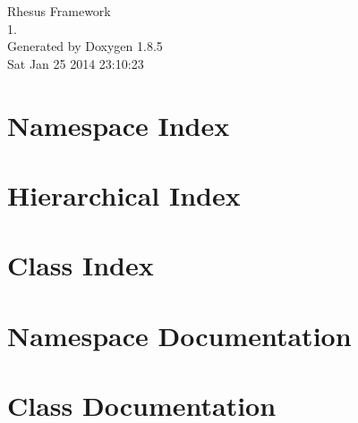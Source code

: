 \documentclass[twoside]{book}
\newcommand{\clearemptydoublepage}{%
  \newpage{\pagestyle{empty}\cleardoublepage}%
}
\begin{document}
\hypersetup{pageanchor=false}
\begin{titlepage}
\vspace*{7cm}
\begin{center}%
{\Large Rhesus Framework \\[1ex]\large 1. }\\
\vspace*{1cm}
{\large Generated by Doxygen 1.8.5}\\
\vspace*{0.5cm}
{\small Sat Jan 25 2014 23:10:23}\\
\end{center}
\end{titlepage}
\clearemptydoublepage
\tableofcontents
\clearemptydoublepage
{}
\hypersetup{pageanchor=true}

\chapter{Namespace Index}

\chapter{Hierarchical Index}

\chapter{Class Index}

\chapter{Namespace Documentation}

\chapter{Class Documentation}
















\newpage
{}
{}
\printindex
\end{document}
